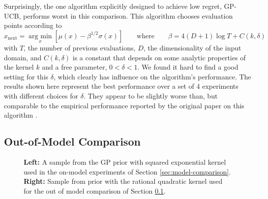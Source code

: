 \documentclass[twoside,11pt]{article}
\newcommand{\argmin}{\operatorname*{arg\: min}}
\newcommand{\inputTikZ}[1]{%
 }
\newcommand{\inputTikZ}[1]{%
   \beginpgfgraphicnamed{#1-external}%
   \endpgfgraphicnamed%
 }
\begin{document}
Surprisingly, the one algorithm explicitly designed to achieve low
regret, GP-UCB, performs worst in this comparison. This algorithm
chooses evaluation points according to \citep{srinivasgaussian}
\begin{equation}
  \label{eq:30}
  x_{\text{next}} = \argmin_x [ \mu(x) - \beta^{1/2} \sigma(x) ]\qquad
\text{where} \qquad \beta = 4(D+1)\log T + C(k,\delta)
\end{equation}
with $T$, the number of previous evaluations, $D$, the dimensionality
of the input domain, and $C(k,\delta)$ is a constant that depends on
some analytic properties of the kernel $k$ and a free parameter,
$0<\delta<1$. We found it hard to find a good setting for this
$\delta$, which clearly has influence on the algorithm's
performance. The results shown here represent the best performance
over a set of 4 experiments with different choices for $\delta$. They
appear to be slightly worse than, but comparable to the empirical
performance reported by the original paper on this algorithm
\citep[][Figure 5a]{srinivasgaussian}.


\subsection{Out-of-Model Comparison}
\label{sec:out-model-comparison}

\begin{figure}
  \centering
  \inputTikZ{figures/SE_example}\inputTikZ{figures/RQ_example}
  \caption{{\bf Left:} A sample from the GP prior with squared
    exponential kernel used in the on-model experiments of Section
    \ref{sec:model-comparison}. {\bf Right:} Sample from prior with
    the rational quadratic kernel used for the out of model comparison
    of Section \ref{sec:out-model-comparison}.}
  \label{fig:SE_RQ}
\end{figure}
\end{document}
